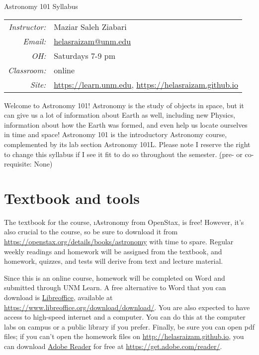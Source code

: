 \documentclass[12pt]{article}
\begin{document}

\newcommand{\TODO}[1]{}

\br\vspace{0cm}\begin{center}\Huge Astronomy 101 Syllabus\end{center}\vspace{.5cm}

\noindent\begin{tabular}{>{\it}r l}
  Instructor:&Maziar Saleh Ziabari\\
  Email:&\href{mailto:helasraizam@unm.edu}{helasraizam@unm.edu}\\
  OH:&Saturdays 7-9 pm\\
  Classroom:&online\\
  Site:&\url{https://learn.unm.edu}, \url{https://helasraizam.github.io}
\end{tabular}
\vspace{.7cm}

Welcome to Astronomy 101!  Astronomy is the study of objects in space, but it can give us a lot of information about Earth as well, including new Physics, information about how the Earth was formed, and even help us locate ourselves in time and space!  Astronomy 101 is the introductory Astronomy course, complemented by its lab section Astronomy 101L.  Please note I reserve the right to change this syllabus if I see it fit to do so throughout the semester.  \b{(pre- or co-requisite: None)}

\section*{Textbook and tools}
The textbook for the course, \i{Astronomy} from OpenStax, is free!  However, it's also crucial to the course, so be sure to download it from \url{https://openstax.org/details/books/astronomy} with time to spare.  Regular weekly readings and homework will be assigned from the textbook, and homework, quizzes, and tests will derive from text and lecture material.

Since this is an online course, homework will be completed on Word and submitted through UNM Learn.  A free alternative to Word that you can download is \href{https://www.libreoffice.org/download/download/}{Libreoffice}, available at \url{https://www.libreoffice.org/download/download/}.  You are also expected to have access to high-speed internet and a computer.  You can do this at the computer labs on campus or a public library if you prefer.  Finally, be sure you can open pdf files; if you can't open the homework files on \url{http://helasraizam.github.io}, you can download \href{https://get.adobe.com/reader/}{Adobe Reader} for free at \url{https://get.adobe.com/reader/}.
\end{document}
